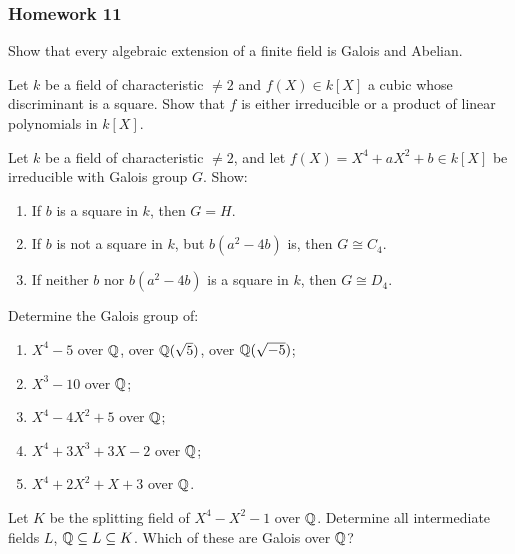 \subsubsection{Homework 11}
\setcounter{exercise}{0}
\setcounter{equation}{0}

\begin{problem}
  Show that every algebraic extension of a finite field is Galois and
  Abelian.
\end{problem}
\begin{solution}
\end{solution}

\begin{problem}
  Let $k$ be a field of characteristic $\neq 2$ and $f(X)\in k[X]$ a
  cubic whose discriminant is a square. Show that $f$ is either irreducible
  or a product of linear polynomials in $k[X]$.
\end{problem}
\begin{solution}
\end{solution}

\begin{problem}
  Let $k$ be a field of characteristic $\neq 2$, and let
  $f(X)=X^4+aX^2+b\in k[X]$ be irreducible with Galois group $G$. Show:
  \begin{enumerate}[label=(\roman*),noitemsep]
  \item If $b$ is a square in $k$, then $G=H$.
  \item If $b$ is not a square in $k$, but $b(a^2-4b)$ is, then
    $G\cong C_4$.
  \item If neither $b$ nor $b(a^2-4b)$ is a square in $k$, then
    $G\cong D_4$.
  \end{enumerate}
\end{problem}
\begin{solution}
\end{solution}

\begin{problem}
  Determine the Galois group of:
  \begin{enumerate}[label=(\alph*),noitemsep]
  \item $X^4-5$ over $\mathbb{Q}$, over $\mathbb{Q}(\sqrt{5})$, over $\mathbb{Q}(\sqrt{-5})$;
  \item $X^3-10$ over $\mathbb{Q}$;
  \item $X^4-4X^2+5$ over $\mathbb{Q}$;
  \item $X^4+3X^3+3X-2$ over $\mathbb{Q}$;
  \item $X^4+2X^2+X+3$ over $\mathbb{Q}$.
  \end{enumerate}
\end{problem}
\begin{solution}
\end{solution}

\begin{problem}
  Let $K$ be the splitting field of $X^4-X^2-1$ over $\mathbb{Q}$. Determine
  all intermediate fields $L$, $\mathbb{Q}\subseteq L\subseteq K$. Which of
  these are Galois over $\mathbb{Q}$?
\end{problem}
\begin{solution}
\end{solution}

